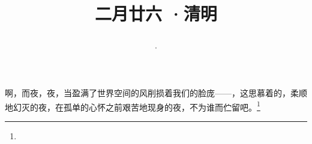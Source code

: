 \title{\date[d=4,m=4,y=2024][year:cn-y,年,month:cn,day:cn,日,·,weekday]·二月廿六 ·清明}
啊，而夜，夜，当盈满了世界空间的风削损着我们的脸庞——，这思慕着的，柔顺地幻灭的夜，在孤单的心怀之前艰苦地现身的夜，不为谁而伫留吧。\footnote{ }

